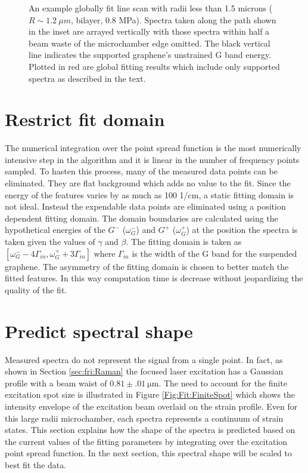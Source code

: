 \begin{figure}
	\begin{center}
	
	\end{center}
	\caption[An example globally fit line scan with radii less than 1.5 microns]{\label{fig:Fit:igouter}
	An example globally fit line scan with radii less than 1.5 microns ($R\sim 1.2 \ \mu m$, bilayer, 0.8 MPa).
	Spectra taken along the path shown in the inset are arrayed vertically with those spectra within half a beam waste of the microchamber edge omitted. 
	The black vertical line indicates the supported graphene's unstrained G band energy.
	Plotted in red are global fitting results which include only supported spectra as described in the text.}
\end{figure}

\section*{Restrict fit domain}
The numerical integration over the point spread function is the most numerically intensive step in the algorithm and it is linear in the number of frequency points sampled.
To hasten this process, many of the measured data points can be eliminated.
They are flat background which adds no value to the fit.
Since the energy of the features varies by as much as 100 1/cm, a static fitting domain is not ideal.
Instead the expendable data points are eliminated using a position dependent fitting domain.
The domain boundaries are calculated using the hypothetical energies of the $G^-$ ($\omega_{G}^-$) and $G^+$ ($\omega_{G}^+$) at the position the spectra is taken given the values of $\gamma$ and $\beta$.
The fitting domain is taken as $[\omega_{G}^- - 4 \Gamma_{in},\omega_{G}^+  +3 \Gamma_{in}]$ where $\Gamma_{in}$ is the width of the G band for the suspended graphene.
The asymmetry of the fitting domain is chosen to better match the fitted features.
In this way computation time is decrease without jeopardizing the quality of the fit.

\section*{Predict spectral shape}
Measured spectra do not represent the signal from a single point.
In fact, as shown in Section \ref{sec:fri:Raman} the focused laser excitation has a Gaussian profile with a beam waist of $0.81 \pm .01 \ \mathrm{\mu m}$.
The need to account for the finite excitation spot size is illustrated in Figure \ref{Fig:Fit:FiniteSpot} which shows the intensity envelope of the excitation beam overlaid on the strain profile.
Even for this large radii microchamber, each spectra represents a continuum of strain states.
This section explains how the shape of the spectra is predicted based on the current values of the fitting parameters by integrating over the excitation point spread function.
In the next section, this spectral shape will be scaled to best fit the data.


